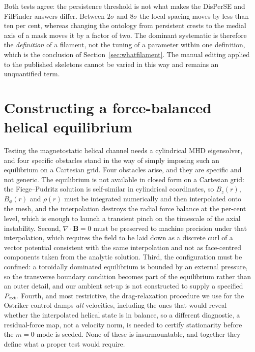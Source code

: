 \documentclass[usenatbib,twoside,twocolumn]{mnras}
\begin{document}
\smallskip\noindent Both tests agree: the persistence threshold is not what makes the DisPerSE and FilFinder answers differ. Between $2\sigma$ and $8\sigma$ the local spacing moves by less than ten per cent, whereas changing the ontology from persistent crests to the medial axis of a mask moves it by a factor of two. The dominant systematic is therefore the \emph{definition} of a filament, not the tuning of a parameter within one definition, which is the conclusion of Section~\ref{sec:whatfilament}. The manual editing applied to the published skeletons cannot be varied in this way and remains an unquantified term.



\section{Constructing a force-balanced helical equilibrium}
\label{sec:helical}

Testing the magnetostatic helical channel needs a cylindrical MHD eigensolver, and four specific obstacles stand in the way of simply imposing such an equilibrium on a Cartesian grid. Four obstacles arise, and they are specific  and not generic. The equilibrium is not available in closed form on a Cartesian grid: the Fiege--Pudritz solution is self-similar in cylindrical coordinates, so $B_z(r)$, $B_\phi(r)$ and $\rho(r)$ must be integrated numerically and then interpolated onto the mesh, and the interpolation destroys the radial force balance at the per-cent level, which is enough to launch a transient pinch on the timescale of the axial instability. Second, $\nabla\!\cdot\!\mathbf{B}=0$ must be preserved to machine precision under that interpolation, which requires the field to be laid down as a discrete curl of a vector potential consistent with the same interpolation and not as face-centred components taken from the analytic solution. Third, the configuration must be confined: a toroidally dominated equilibrium is bounded by an external pressure, so the transverse boundary condition becomes part of the equilibrium rather than an outer detail, and our ambient set-up is not constructed to supply a specified $P_{\rm ext}$. Fourth, and most restrictive, the drag-relaxation procedure we use for the Ostriker control damps \emph{all} velocities, including the ones that would reveal whether the interpolated helical state is in balance, so a different diagnostic, a residual-force map, not a velocity norm, is needed to certify stationarity before the $m=0$ mode is seeded. None of these is insurmountable, and together they define what a proper test would require.
\end{document}
